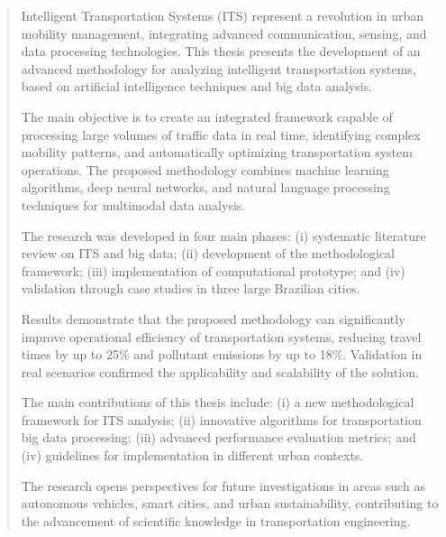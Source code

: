 \documentclass[doutorado,onehalfspacing,12pt,hyperref]{UnB-PPGT}
\begin{document}
\begin{abstract}
Intelligent Transportation Systems (ITS) represent a revolution in urban mobility management, integrating advanced communication, sensing, and data processing technologies. This thesis presents the development of an advanced methodology for analyzing intelligent transportation systems, based on artificial intelligence techniques and big data analysis.

The main objective is to create an integrated framework capable of processing large volumes of traffic data in real time, identifying complex mobility patterns, and automatically optimizing transportation system operations. The proposed methodology combines machine learning algorithms, deep neural networks, and natural language processing techniques for multimodal data analysis.

The research was developed in four main phases: (i) systematic literature review on ITS and big data; (ii) development of the methodological framework; (iii) implementation of computational prototype; and (iv) validation through case studies in three large Brazilian cities.

Results demonstrate that the proposed methodology can significantly improve operational efficiency of transportation systems, reducing travel times by up to 25\% and pollutant emissions by up to 18\%. Validation in real scenarios confirmed the applicability and scalability of the solution.

The main contributions of this thesis include: (i) a new methodological framework for ITS analysis; (ii) innovative algorithms for transportation big data processing; (iii) advanced performance evaluation metrics; and (iv) guidelines for implementation in different urban contexts.

The research opens perspectives for future investigations in areas such as autonomous vehicles, smart cities, and urban sustainability, contributing to the advancement of scientific knowledge in transportation engineering.
\end{abstract}

\listoffigures
\listoftables
\end{document}
